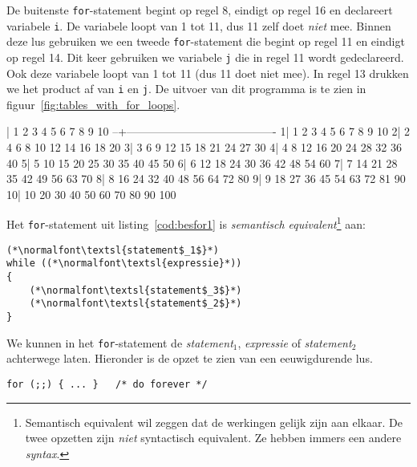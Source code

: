 
De buitenste \texttt{for}-statement begint op regel 8, eindigt op regel 16 en declareert variabele \texttt{i}. De variabele loopt van 1 tot 11, dus 11 zelf doet \textsl{niet} mee. Binnen deze lus gebruiken we een tweede \texttt{for}-statement die begint op regel 11 en eindigt op regel 14. Dit keer gebruiken we variabele \texttt{j} die in regel 11 wordt gedeclareerd. Ook deze variabele loopt van 1 tot 11 (dus 11 doet niet mee). In regel 13 drukken we het product af van \texttt{i} en \texttt{j}. De uitvoer van dit programma is te zien in figuur~\ref{fig:tables_with_for_loops}.

\begin{dosbox}[title=Uitvoer van het programma in listing~\ref{cod:tables_with_for_loops}.,label=fig:tables_with_for_loops]
  |   1   2   3   4   5   6   7   8   9  10
--+----------------------------------------
 1|   1   2   3   4   5   6   7   8   9  10
 2|   2   4   6   8  10  12  14  16  18  20
 3|   3   6   9  12  15  18  21  24  27  30
 4|   4   8  12  16  20  24  28  32  36  40
 5|   5  10  15  20  25  30  35  40  45  50
 6|   6  12  18  24  30  36  42  48  54  60
 7|   7  14  21  28  35  42  49  56  63  70
 8|   8  16  24  32  40  48  56  64  72  80
 9|   9  18  27  36  45  54  63  72  81  90
10|  10  20  30  40  50  60  70  80  90 100
\end{dosbox}

Het \texttt{for}-statement uit listing~\ref{cod:besfor1} is \textsl{semantisch equivalent}\footnote{Semantisch equivalent wil zeggen dat de werkingen gelijk zijn aan elkaar. De twee opzetten zijn \textsl{niet} syntactisch equivalent. Ze hebben immers een andere \textsl{syntax}.} aan:

\begin{lstlisting}[caption=\texttt{while}-statement als \texttt{for}-statement.,label=cod:besforaswhile]
(*\normalfont\textsl{statement$_1$}*)
while ((*\normalfont\textsl{expressie}*))
{
    (*\normalfont\textsl{statement$_3$}*)
    (*\normalfont\textsl{statement$_2$}*)
}
\end{lstlisting}

We kunnen in het \texttt{for}-statement de \textsl{statement}$_1$, \textsl{expressie} of \textsl{statement}$_2$ achterwege laten. Hieronder is de opzet te zien van een eeuwigdurende lus.

\hspace*{1em}\texttt{for (;;) \{ ... \}\ \ \    /* do forever */}


